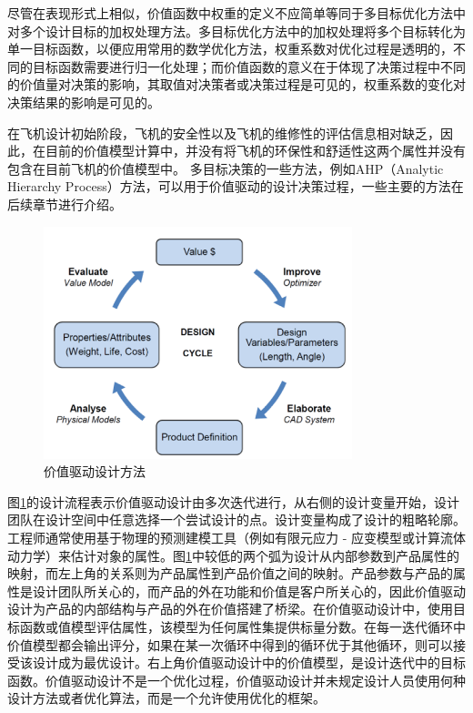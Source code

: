 \documentclass[12pt,a4paper]{report}
\begin{document}
尽管在表现形式上相似，价值函数中权重的定义不应简单等同于多目标优化方法中对多个设计目标的加权处理方法。多目标优化方法中的加权处理将多个目标转化为单一目标函数，以便应用常用的数学优化方法，权重系数对优化过程是透明的，不同的目标函数需要进行归一化处理；而价值函数的意义在于体现了决策过程中不同的价值量对决策的影响，其取值对决策者或决策过程是可见的，权重系数的变化对决策结果的影响是可见的。

在飞机设计初始阶段，飞机的安全性以及飞机的维修性的评估信息相对缺乏，因此，在目前的价值模型计算中，并没有将飞机的环保性和舒适性这两个属性并没有包含在目前飞机的价值模型中。 多目标决策的一些方法，例如AHP（Analytic Hierarchy Process）方法，可以用于价值驱动的设计决策过程，一些主要的方法在后续章节进行介绍。


\begin{figure}[H]
	\centering
		\includegraphics[width=0.8\textwidth]{./media3/image2.png}
		\caption{价值驱动设计方法}
		\label{fig:g32_vdd}
\end{figure}

\vspace{\baselineskip}
图\ref{fig:g32_vdd}的设计流程表示价值驱动设计由多次迭代进行，从右侧的设计变量开始，设计团队在设计空间中任意选择一个尝试设计的点。设计变量构成了设计的粗略轮廓。工程师通常使用基于物理的预测建模工具（例如有限元应力 - 应变模型或计算流体动力学）来估计对象的属性。图\ref{fig:g32_vdd}中较低的两个弧为设计从内部参数到产品属性的映射，而左上角的关系则为产品属性到产品价值之间的映射。产品参数与产品的属性是设计团队所关心的，而产品的外在功能和价值是客户所关心的，因此价值驱动设计为产品的内部结构与产品的外在价值搭建了桥梁。在价值驱动设计中，使用目标函数或值模型评估属性，该模型为任何属性集提供标量分数。在每一迭代循环中价值模型都会输出评分，如果在某一次循环中得到的循环优于其他循环，则可以接受该设计成为最优设计。右上角价值驱动设计中的价值模型，是设计迭代中的目标函数。价值驱动设计不是一个优化过程，价值驱动设计并未规定设计人员使用何种设计方法或者优化算法，而是一个允许使用优化的框架。
\end{document}
